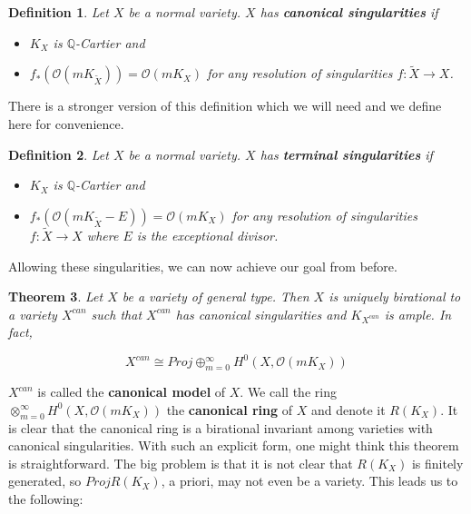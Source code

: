 \documentclass[a4paper]{article}
\newtheorem{theorem}{Theorem}
\newtheorem{definition}[theorem]{Definition}
\numberwithin{theorem}{section}
\begin{document}
\begin{definition}
Let $X$ be a normal variety. $X$ has \textbf{canonical singularities} if

\begin{itemize}
  \item $K_X$ is $\mathbb{Q}$-Cartier and
  \item $f_*(\mathcal{O}( mK_{\tilde{X}})) = \mathcal{O}(mK_X) $ for any resolution of singularities $f: \tilde{X} \rightarrow X$.
\end{itemize}
\end{definition}

There is a stronger version of this definition which we will need and we define here for convenience.

\begin{definition}
Let $X$ be a normal variety. $X$ has \textbf{terminal singularities} if

\begin{itemize}
  \item $K_X$ is $\mathbb{Q}$-Cartier and
  \item $f_*(\mathcal{O}( mK_{\tilde{X}} - E)) = \mathcal{O}(mK_X) $ for any resolution of singularities $f: \tilde{X} \rightarrow X$ where $E$ is the exceptional divisor.
\end{itemize}
\end{definition}

Allowing these singularities, we can now achieve our goal from before.

\begin{theorem}\label{can_main}
Let $X$ be a variety of general type. Then $X$ is uniquely birational to a variety $X^{can}$ such that $X^{can}$ has canonical singularities and $K_{X^{can}}$ is ample. In fact,

$$ X^{can} \cong Proj \oplus_{m=0}^\infty H^0(X, \mathcal{O}(mK_X)) $$

\end{theorem}

$X^{can}$ is called the \textbf{canonical model} of $X$. We call the ring $\otimes_{m=0}^\infty H^0(X, \mathcal{O}(mK_X))$ the \textbf{canonical ring} of $X$ and denote it $R(K_X)$. It is clear that the canonical ring is a birational invariant among varieties with canonical singularities. With such an explicit form, one might think this theorem is straightforward. The big problem is that it is not clear that $R(K_X)$ is finitely generated, so $Proj R(K_X)$, a priori, may not even be a variety. This leads us to the following:
\end{document}
